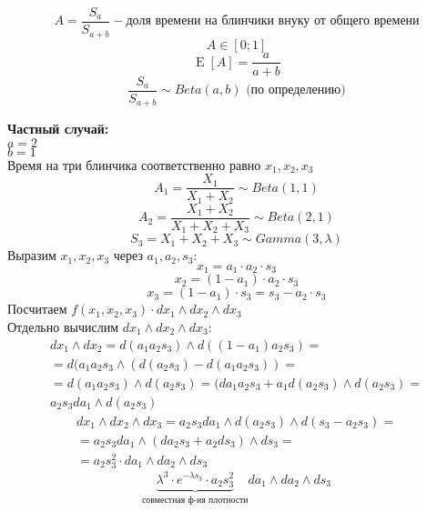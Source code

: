 \documentclass[12pt]{article} %
\theoremstyle{definition} %
\DeclareMathOperator{\E}{E}
\begin{document}
\begin{enumerate}
\begin{center}
\end{center}
        \[
            A = \frac{S_a}{S_{a+b}} - \text{доля времени на блинчики внуку от общего времени}
        \]
        \[
            A \in [0;1]
        \]
        \[
            \E[A] = \frac{a}{a+b}
        \]
        \[
             \frac{S_a}{S_{a+b}} \sim Beta(a, b) \text{ (по определению)}
        \]
    \end{enumerate}
    \textbf{Частный случай:}\\
    $a = 2$  \\
    $b = 1$ \\
    Время на три блинчика соответственно равно $x_1, x_2, x_3$
    \[
        A_1 = \frac{X_1}{X_1 + X_2} \sim Beta(1, 1)
    \]
    \[
        A_2 = \frac{X_1 + X_2}{X_1 + X_2 + X_3} \sim Beta(2, 1)
    \]
    \[
        S_3 = X_1 + X_2 + X_3 \sim Gamma(3, \lambda)
    \]
    Выразим $x_1, x_2, x_3$ через $a_1, a_2, s_3$:
    \[
        x_1 = a_1 \cdot a_2 \cdot s_3
    \]
    \[
        x_2 = (1 - a_1) \cdot a_2 \cdot s_3
    \]
    \[
        x_3 = (1 - a_1) \cdot s_3 = s_3 - a_2 \cdot s_3
    \]
    Посчитаем $f(x_1, x_2, x_3) \cdot dx_1 \wedge dx_2 \wedge dx_3$ \\
    Отдельно вычислим $dx_1 \wedge dx_2 \wedge dx_3$:
    \begin{eqnarray*}
        dx_1 \wedge dx_2 = d(a_1 a_2 s_3) \wedge d((1 - a_1) a_2 s_3) = \\
        = d(a_1 a_2 s_3 \wedge (d(a_2 s_3) - d(a_1 a_2 s_3)) = \\
        =d(a_1 a_2 s_3) \wedge d(a_2 s_3) = (da_1 a_2 s_3 + a_1 d(a_2 s_3) \wedge d(a_2 s_3) = \\
        a_2 s_3 da_1 \wedge d(a_2 s_3)
    \end{eqnarray*}
    \begin{eqnarray*}
        dx_1 \wedge dx_2 \wedge dx_3 = a_2 s_3 da_1 \wedge d(a_2 s_3) \wedge d(s_3 - a_2 s_3) = \\
        = a_2 s_3 da_1 \wedge (da_2 s_3 + a_2 ds_3) \wedge ds_3 = \\
        = a_2 s_3^2 \cdot da_1 \wedge da_2 \wedge ds_3
    \end{eqnarray*}
    \[
        \underbrace{\lambda^3 \cdot e^{- \lambda s_3}\cdot a_2 s_3^2}_{\text{совместная ф-ия плотности}} da_1 \wedge da_2 \wedge ds_3
    \]
\end{document}
